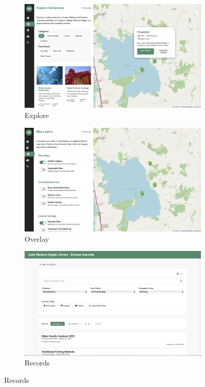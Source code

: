 \begin{figure}[H]
  \vspace{0.5cm}

  \begin{subfigure}[b]{0.3\textwidth}
    \includegraphics[width=\textwidth]{screenshot/prototype_explore.png}
    \caption{Explore}
  \end{subfigure}\hfill
  \begin{subfigure}[b]{0.3\textwidth}
    \includegraphics[width=\textwidth]{screenshot/prototype_overlay.png}
    \caption{Overlay}
  \end{subfigure}\hfill
  \begin{subfigure}[b]{0.3\textwidth}
    \includegraphics[width=\textwidth]{screenshot/prototype_records.png}
    \caption{Records}
  \end{subfigure}


\end{figure}
